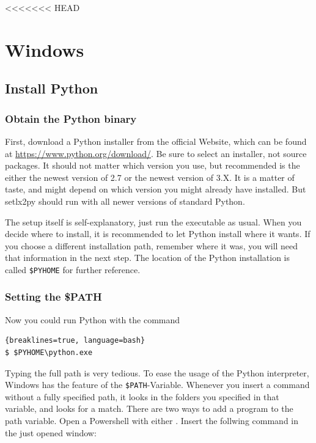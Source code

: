 <<<<<<< HEAD
\section{Windows}

\subsection{Install Python}

\subsubsection{Obtain the Python binary}

First, download a Python installer from the official Website, which can be found at \url{https://www.python.org/download/}. Be sure to select an installer, not source packages. It should not matter which version you use, but recommended is the either the newest version of 2.7 or the newest version of 3.X. It is a matter of taste, and might depend on which version you might already have installed. But setlx2py should run with all newer versions of standard Python.

The setup itself is self-explanatory, just run the executable as usual. When you decide where to install, it is recommended to let Python install where it wants. If you choose a different installation path, remember where it was, you will need that information in the next step. The location of the Python installation is called \texttt{\$PYHOME} for further reference.

\subsubsection{Setting the \$PATH}

Now you could run Python with the command

\begin{lstlisting}{breaklines=true, language=bash}
$ $PYHOME\python.exe
\end{lstlisting}

Typing the full path is very tedious. To ease the usage of the Python interpreter, Windows has the feature of the \texttt{\$PATH}-Variable. Whenever you insert a command without a fully specified path, it looks in the folders you specified in that variable, and looks for a match. There are two ways to add a program to the path variable. Open a Powershell with either . Insert the follwing command in the just opened window: 

